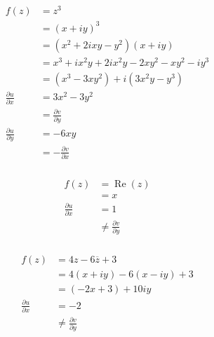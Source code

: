 \documentclass{article}
\renewcommand{\Re}{\operatorname{Re}}
\begin{document}
\begin{align*}
  f(z)                          & = z^3                                                 \\
                                & = (x + i y)^3                                         \\
                                & = (x^2 + 2 i x y - y^2) (x + i y)                     \\
                                & = x^3 + i x^2 y + 2 i x^2 y - 2 x y^2 - x y^2 - i y^3 \\
                                & = (x^3 - 3 x y^2) + i (3 x^2 y - y^3)                 \\
  \frac{\partial u}{\partial x} & = 3 x^2 - 3 y^2                                       \\
                                & = \frac{\partial v}{\partial y}                       \\
  \frac{\partial u}{\partial y} & = -6 x y                                              \\
                                & = -\frac{\partial v}{\partial x}
\end{align*}

\setcounter{subsubsection}{2}
\subsubsection{}

\begin{align*}
  f(z)                          & = \Re (z)                         \\
                                & = x                               \\
  \frac{\partial u}{\partial x} & = 1                               \\
                                & \ne \frac{\partial v}{\partial y}
\end{align*}

\setcounter{subsubsection}{4}
\subsubsection{}

\begin{align*}
  f(z)                          & = 4 z - 6 \overline{z} + 3        \\
                                & = 4 (x + i y) - 6 (x - i y) + 3   \\
                                & = (-2 x + 3) + 10 i y             \\
  \frac{\partial u}{\partial x} & = -2                              \\
                                & \ne \frac{\partial v}{\partial y}
\end{align*}
\end{document}
